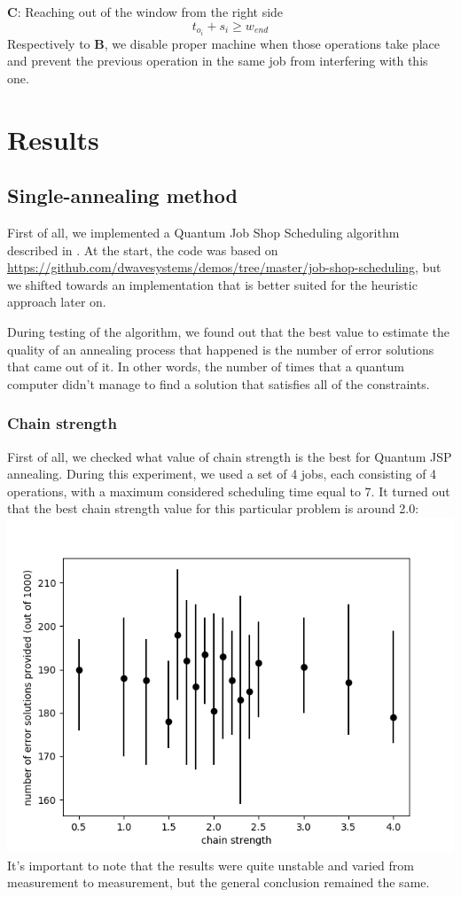 \documentclass[letterpaper, 11pt]{article}
\begin{document}
\begin{multicols}{2}
\textbf{C}: Reaching out of the window from the right side
\begin{equation}
        t_{o_i} + s_i \geq w_{end}
\end{equation}
Respectively to \textbf{B}, we disable proper machine when those
operations take place and prevent the previous operation in the
same job from interfering with this one.

\section{Results}
\subsection{Single-annealing method}
First of all, we implemented a Quantum Job Shop Scheduling algorithm
described in \cite{main_paper}. At the start, the code was based on
\url{https://github.com/dwavesystems/demos/tree/master/job-shop-scheduling},
but we shifted towards an implementation that is better suited for
the heuristic approach later on. 

During testing of the algorithm, we found out that the best value to
estimate the quality of an annealing process that happened is
the number of error solutions that came out of it. In other words,
the number of times that a quantum computer didn't manage to
find a solution that satisfies all of the constraints.

\subsubsection{Chain strength}
First of all, we checked what value of chain strength is the best for
Quantum JSP annealing. During this experiment, we used a set of 4 jobs,
each consisting of 4 operations, with a maximum considered scheduling
time equal to 7. It turned out that the best chain strength
value for this particular problem is around 2.0:
\includegraphics[width=\linewidth]{chain_strength.png}
It's important to note that the results were quite unstable and
varied from measurement to measurement, but the general conclusion
remained the same.


\end{multicols}
\end{document}
